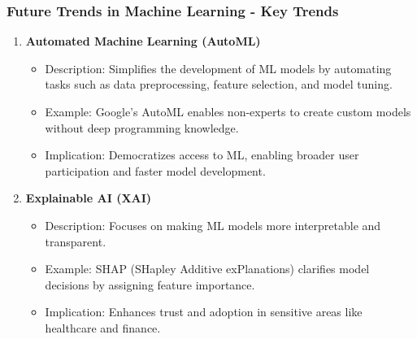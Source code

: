 \documentclass{beamer}
\begin{document}
\begin{frame}[fragile]
    \frametitle{Future Trends in Machine Learning - Key Trends}
    \begin{enumerate}
        \item \textbf{Automated Machine Learning (AutoML)}
        \begin{itemize}
            \item Description: Simplifies the development of ML models by automating tasks such as data preprocessing, feature selection, and model tuning.
            \item Example: Google’s AutoML enables non-experts to create custom models without deep programming knowledge.
            \item Implication: Democratizes access to ML, enabling broader user participation and faster model development.
        \end{itemize}

        \item \textbf{Explainable AI (XAI)}
        \begin{itemize}
            \item Description: Focuses on making ML models more interpretable and transparent.
            \item Example: SHAP (SHapley Additive exPlanations) clarifies model decisions by assigning feature importance.
            \item Implication: Enhances trust and adoption in sensitive areas like healthcare and finance.
        \end{itemize}
    \end{enumerate}
\end{frame}
\end{document}
